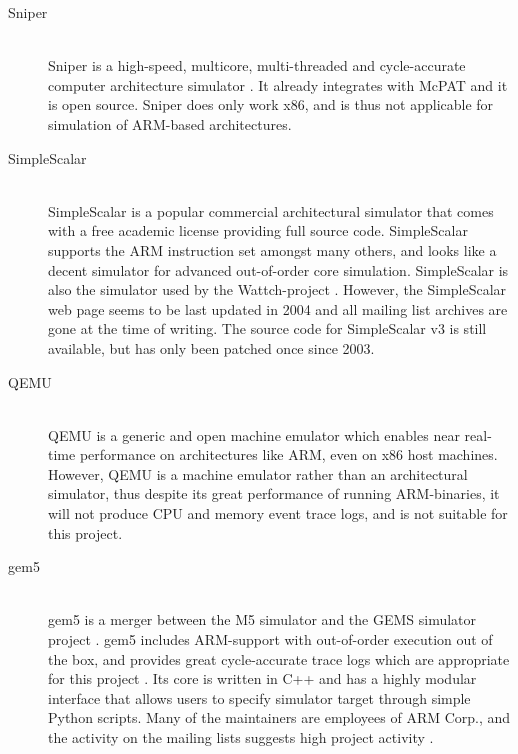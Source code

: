 \begin{description}
\item[Sniper] \hfill\\
    Sniper is a high-speed, multicore, multi-threaded and cycle-accurate
    computer architecture simulator \cite{sniperwebpage,carlson2013ssomta}. It
    already integrates with McPAT and it is open source. Sniper does only work
    x86, and is thus not applicable for simulation of ARM-based architectures.

\item[SimpleScalar] \hfill\\
    SimpleScalar is a popular commercial architectural simulator that comes with
    a free academic license providing full source code. SimpleScalar supports
    the ARM instruction set amongst many others, and looks like a decent
    simulator for advanced out-of-order core simulation. SimpleScalar is also
    the simulator used by the Wattch-project \cite{brooks2000wattch}. However,
    the SimpleScalar web page seems to be last updated in 2004 and all mailing
    list archives are gone at the time of writing. The source code for
    SimpleScalar v3 is still available, but has only been patched once since
    2003.

\item[QEMU]\hfill\\
    QEMU is a generic and open machine emulator which enables near real-time
    performance on architectures like ARM, even on x86 host machines. However,
    QEMU is a machine emulator rather than an architectural simulator, thus
    despite its great performance of running ARM-binaries, it will not produce
    CPU and memory event trace logs, and is not suitable for this project.

\item[gem5]\hfill\\
    gem5 is a merger between the M5 simulator \cite{binkert2006m5} and the GEMS
    simulator project \cite{GEMS}. gem5 includes ARM-support with out-of-order
    execution out of the box, and provides great cycle-accurate trace logs which
    are appropriate for this project \cite{gem5simulator}. Its core is written
    in C++ and has a highly modular interface that allows users to specify
    simulator target through simple Python scripts. Many of the maintainers are
    employees of ARM Corp., and the activity on the mailing lists suggests high
    project activity \cite{gem5dev}.
\end{description}

